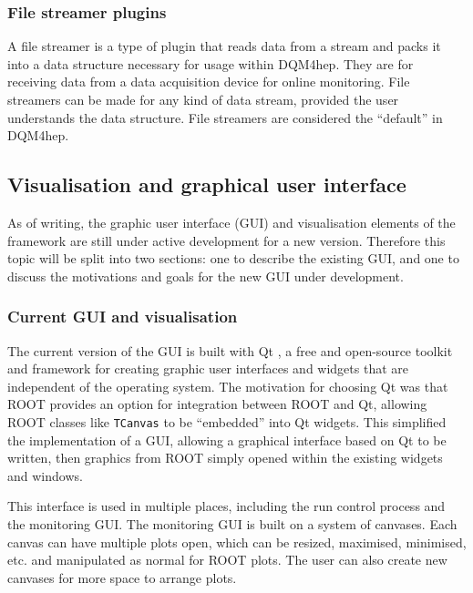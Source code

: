 \subsubsection{File streamer plugins}
A file streamer is a type of plugin that reads data from a stream and packs it into a data structure necessary for usage within \acrshort{DQM4hep}. They are for receiving data from a data acquisition device for online monitoring. File streamers can be made for any kind of data stream, provided the user understands the data structure. File streamers are considered the ``default'' in \acrshort{DQM4hep}.

\subsection{Visualisation and graphical user interface}
As of writing, the graphic user interface (\acrshort{GUI}) and visualisation elements of the framework are still under active development for a new version. Therefore this topic will be split into two sections: one to describe the existing \acrshort{GUI}, and one to discuss the motivations and goals for the new \acrshort{GUI} under development. 

\subsubsection{Current GUI and visualisation} 
The current version of the \acrshort{GUI} is built with Qt \cite{qt-website} , a free and open-source toolkit and framework for creating graphic user interfaces and widgets that are independent of the operating system. The motivation for choosing Qt was that ROOT provides an option for integration between ROOT and Qt, allowing ROOT classes like \texttt{TCanvas} to be ``embedded'' into Qt widgets. This simplified the implementation of a \acrshort{GUI}, allowing a graphical interface based on Qt to be written, then graphics from ROOT simply opened within the existing widgets and windows. %

This interface is used in multiple places, including the run control process and the monitoring \acrshort{GUI}. The monitoring \acrshort{GUI} is built on a system of canvases. Each canvas can have multiple plots open, which can be resized, maximised, minimised, etc. and manipulated as normal for ROOT plots. The user can also create new canvases for more space to arrange plots.


